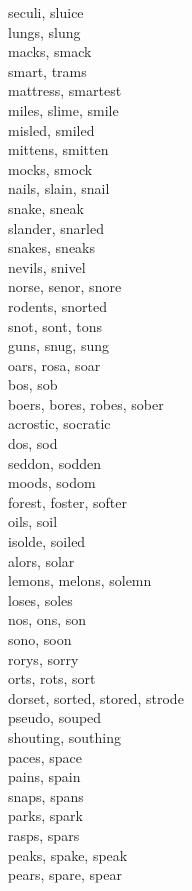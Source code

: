 seculi, sluice\\
lungs, slung\\
macks, smack\\
smart, trams\\
mattress, smartest\\
miles, slime, smile\\
misled, smiled\\
mittens, smitten\\
mocks, smock\\
nails, slain, snail\\
snake, sneak\\
slander, snarled\\
snakes, sneaks\\
nevils, snivel\\
norse, senor, snore\\
rodents, snorted\\
snot, sont, tons\\
guns, snug, sung\\
oars, rosa, soar\\
bos, sob\\
boers, bores, robes, sober\\
acrostic, socratic\\
dos, sod\\
seddon, sodden\\
moods, sodom\\
forest, foster, softer\\
oils, soil\\
isolde, soiled\\
alors, solar\\
lemons, melons, solemn\\
loses, soles\\
nos, ons, son\\
sono, soon\\
rorys, sorry\\
orts, rots, sort\\
dorset, sorted, stored, strode\\
pseudo, souped\\
shouting, southing\\
paces, space\\
pains, spain\\
snaps, spans\\
parks, spark\\
rasps, spars\\
peaks, spake, speak\\
pears, spare, spear\\
